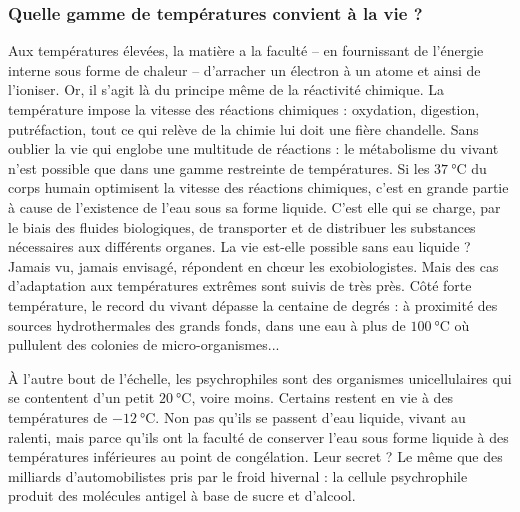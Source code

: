 \subsubsection{Quelle gamme de températures convient à la vie ?}

Aux températures élevées, la matière a la faculté -- en fournissant de l'énergie interne sous forme de chaleur -- d'arracher un électron à un atome et ainsi de l'ioniser. Or, il s'agit là du principe même de la réactivité chimique. La température impose la vitesse des réactions chimiques : oxydation, digestion, putréfaction, tout ce qui relève de la chimie lui doit une fière chandelle. Sans oublier la vie qui englobe une multitude de réactions : le métabolisme du vivant n'est possible que dans une gamme restreinte de températures. Si les \(\SI{37}{\degreeCelsius}\) du corps humain optimisent la vitesse des réactions chimiques, c'est en grande partie à cause de l'existence de l'eau sous sa forme liquide. C'est elle qui se charge, par le biais des fluides biologiques, de transporter et de distribuer les substances nécessaires aux différents organes. La vie est-elle possible sans eau liquide ? Jamais vu, jamais envisagé, répondent en chœur les exobiologistes. Mais des cas d'adaptation aux températures extrêmes sont suivis de très près. Côté forte température, le record du vivant dépasse la centaine de degrés : à proximité des sources hydrothermales des grands fonds, dans une eau à plus de \(\SI{100}{\degreeCelsius}\) où pullulent des colonies de micro-organismes...

À l'autre bout de l'échelle, les psychrophiles sont des organismes unicellulaires qui se contentent d'un petit \(\SI{20}{\degreeCelsius}\), voire moins. Certains restent en vie à des températures de \(\SI{-12}{\degreeCelsius}\). Non pas qu'ils se passent d'eau liquide, vivant au ralenti, mais parce qu'ils ont la faculté de conserver l'eau sous forme liquide à des températures inférieures au point de congélation. Leur secret ? Le même que des milliards d'automobilistes pris par le froid hivernal : la cellule psychrophile produit des molécules antigel à base de sucre et d'alcool.

